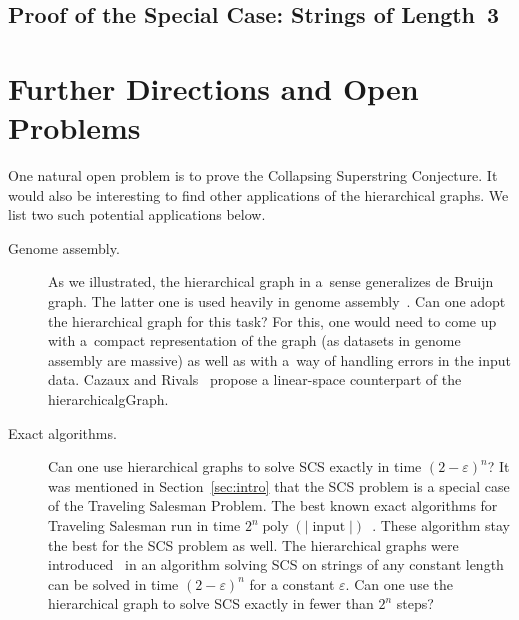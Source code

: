 \documentclass[11pt]{article}
\DeclareMathOperator{\poly}{poly}
\DeclareMathOperator{\inp}{input}
\begin{document}




\subsection{Proof of the Special Case: Strings of Length~3}\label{subsec:scs3}
%


\section{Further Directions and Open Problems}
One natural open problem is to prove the Collapsing Superstring Conjecture.
It would also be interesting to find other applications of the 
hierarchical graphs. We list two such potential applications below.
\begin{description}
\item[Genome assembly.] As we illustrated, the hierarchical graph in a~sense
generalizes de Bruijn graph. The latter one is used heavily 
in genome assembly~\cite{pevzner2001eulerian}.
Can one adopt the hierarchical graph for this task? For this, one
would need to come up with a~compact representation of the graph
(as datasets in genome assembly are massive) as well as with a~way of
handling errors in the input data. Cazaux and Rivals~\cite{cazaux2018hierarchical} propose a linear-space counterpart of the hierarchicalgGraph.

\item[Exact algorithms.] Can one use hierarchical graphs to solve SCS exactly in time $(2-\varepsilon)^n$?
It was mentioned in Section~\ref{sec:intro} that the SCS problem is a special case of the Traveling Salesman Problem. The best known exact algorithms for Traveling Salesman run in time $2^n \poly(|\inp|)$~\cite{B1962, HK1971, KGK1977, K1982, BF1996}. These algorithm stay the best for the SCS problem as well. The hierarchical graphs were introduced~\cite{scs_exact} in an algorithm solving SCS on strings of any constant length can be solved in time $(2-\varepsilon)^n$ for a constant $\varepsilon$. Can one use the hierarchical graph to solve SCS exactly in fewer than $2^n$ steps?
\end{description}



\end{document}
